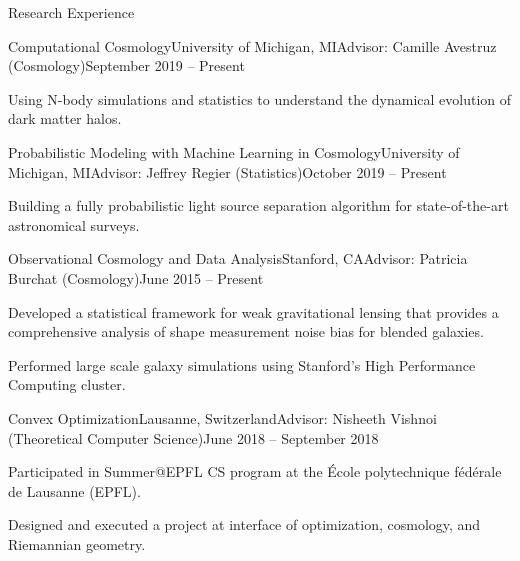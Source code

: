 \documentclass{resume} %
\begin{document}
\begin{rSection}{Research Experience}

\begin{rSubsection}{Computational Cosmology}{University of Michigan, MI}{Advisor: Camille Avestruz (Cosmology)}{September 2019 -- Present}
\item Using N-body simulations and statistics to understand the dynamical evolution of dark matter halos. 
\end{rSubsection}

\begin{rSubsection}{Probabilistic Modeling with Machine Learning in Cosmology}{University of Michigan, MI}{Advisor: Jeffrey Regier (Statistics)}{October 2019 -- Present}
\item Building a fully probabilistic light source separation algorithm for state-of-the-art astronomical surveys.
\end{rSubsection}

\begin{rSubsection}{Observational Cosmology and Data Analysis}{Stanford, CA}{Advisor: Patricia Burchat (Cosmology)}{June 2015 -- Present}
\item Developed a statistical framework for weak gravitational lensing that provides a comprehensive analysis of shape measurement noise bias for blended galaxies.
\item Performed large scale galaxy simulations using Stanford's High Performance Computing cluster.
\end{rSubsection}

\begin{rSubsection}{ Convex Optimization}{Lausanne, Switzerland}{Advisor: Nisheeth Vishnoi (Theoretical Computer Science)}{June 2018 -- September 2018}
\item Participated in Summer@EPFL CS program at the \'Ecole polytechnique f\'ed\'erale de Lausanne (EPFL).
\item Designed and executed a project at interface of optimization, cosmology, and Riemannian geometry.
\end{rSubsection}
\end{rSection}
\end{document}
